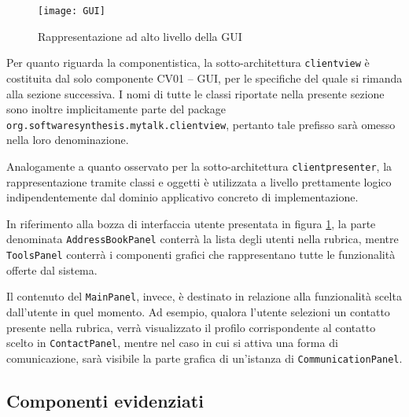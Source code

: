 \begin{figure}[h]
  \centering
  \texttt{[image: GUI]}
  \caption{Rappresentazione ad alto livello della GUI}\label{fig:gui}
\end{figure}

Per quanto riguarda la componentistica, la sotto-architettura \texttt{clientview} è costituita dal solo componente \textsf{CV01 -- GUI}, per le specifiche del quale si rimanda alla sezione successiva. I nomi di tutte le classi riportate nella presente sezione sono inoltre implicitamente parte del package \texttt{org.softwaresynthesis.mytalk.clientview}, pertanto tale prefisso sarà omesso nella loro denominazione.

Analogamente a quanto osservato per la sotto-architettura \texttt{clientpresenter}, la rappresentazione tramite classi e oggetti è utilizzata a livello prettamente logico indipendentemente dal dominio applicativo concreto di implementazione.

In riferimento alla bozza di interfaccia utente presentata in figura \ref{fig:gui}, la parte denominata \texttt{AddressBookPanel} conterrà la lista degli utenti nella rubrica, mentre \texttt{ToolsPanel} conterrà i componenti grafici che rappresentano tutte le funzionalità offerte dal sistema. 

Il contenuto del \texttt{MainPanel}, invece, è destinato in relazione alla funzionalità scelta dall'utente in quel momento. Ad esempio, qualora l'utente selezioni un contatto presente nella rubrica, verrà visualizzato il profilo corrispondente al contatto scelto in \texttt{ContactPanel}, mentre nel caso in cui si attiva una forma di comunicazione, sarà visibile la parte grafica di un'istanza di \texttt{CommunicationPanel}.

\subsection{Componenti evidenziati}

